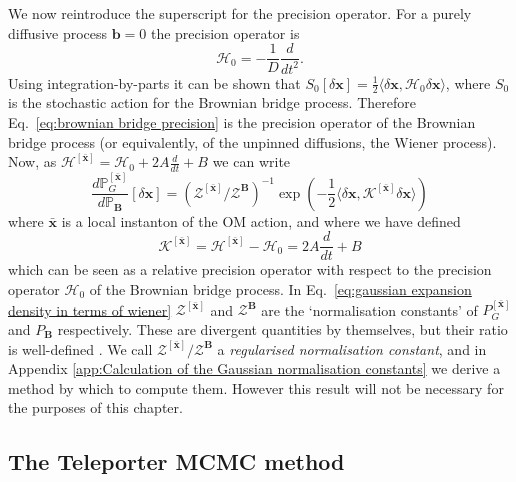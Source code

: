 We now reintroduce the superscript for the precision operator. For a purely diffusive process $\mathbf{b}=0$ the precision operator is
\begin{equation} \label{eq:brownian bridge precision}
	\mathcal{H}_0 = -\frac{1}{D} \frac{d}{d t^2}.
\end{equation}
Using integration-by-parts it can be shown that $S_0[\delta \mathbf{x}] = \frac{1}{2} \langle \delta \mathbf{x}, \mathcal{H}_0 \delta \mathbf{x} \rangle$, where $S_0$ is the stochastic action for the Brownian bridge process. Therefore Eq.~\ref{eq:brownian bridge precision} is the precision operator of the Brownian bridge process (or equivalently, of the unpinned diffusions, the Wiener process). Now, as $\mathcal{H}^{[\bar{\mathbf{x}}]} = \mathcal{H}_0 + 2 A \frac{d}{dt} + B$ we can write
\begin{equation} \label{eq:gaussian expansion density in terms of wiener}
	\frac{d \mathbb{P}_G^{[\bar{\mathbf{x}}]} }{d \mathbb{P}_\mathbf{B}}[ \delta \mathbf{x} ] = (\mathcal{Z}^{[\bar{\mathbf{x}}] } / \mathcal{Z}^\mathbf{B} )^{-1}
	\exp\left( - \frac{1}{2} \langle \delta \mathbf{x}, \mathcal{K}^{[\bar{\mathbf{x}}]} \delta \mathbf{x} \rangle  \right)
\end{equation}
where $\bar{\mathbf{x}}$ is a local instanton of the OM action, and where we have defined
\begin{equation} \label{eq:relative gaussian precision}
	\mathcal{K}^{[\bar{\mathbf{x}}]} = \mathcal{H}^{[\bar{\mathbf{x}}]} - \mathcal{H}_0 = 2A\frac{d}{dt} + B
\end{equation}
which can be seen as a relative precision operator with respect to the precision operator $\mathcal{H}_0$ of the Brownian bridge process. In Eq.~\ref{eq:gaussian expansion density in terms of wiener} $\mathcal{Z}^{[\bar{\mathbf{x}}]}$ and $\mathcal{Z}^\mathbf{B}$ are the `normalisation constants' of $P_G^{[\bar{\mathbf{x}}]}$ and $P_\mathbf{B}$ respectively. These are divergent quantities by themselves, but their ratio is well-defined \citep{gelfandIntegrationFunctionalSpaces1960}. We call $\mathcal{Z}^{[\bar{\mathbf{x}}] } / \mathcal{Z}^\mathbf{B}$ a \textit{regularised normalisation constant}, and in Appendix \ref{app:Calculation of the Gaussian normalisation constants} we derive a method by which to compute them. However this result will not be necessary for the purposes of this chapter.

\subsection{The Teleporter MCMC method}

